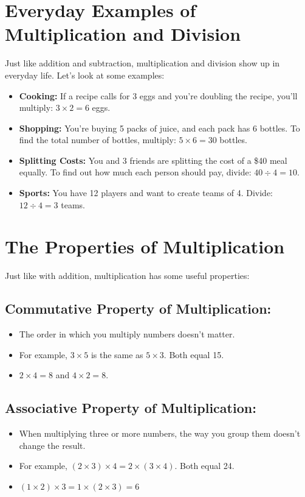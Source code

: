 \section{Everyday Examples of Multiplication and Division}
Just like addition and subtraction, multiplication and division show up in everyday life. Let’s look at some examples:
\begin{itemize}
    \item \textbf{Cooking:} If a recipe calls for 3 eggs and you’re doubling the recipe, you’ll multiply: $3 \times 2 = 6$ eggs.
    \item \textbf{Shopping:} You’re buying 5 packs of juice, and each pack has 6 bottles. To find the total number of bottles, multiply: $5 \times 6 = 30$ bottles.
    \item \textbf{Splitting Costs:} You and 3 friends are splitting the cost of a \$40 meal equally. To find out how much each person should pay, divide: $40 \div 4 = 10$.
    \item \textbf{Sports:} You have 12 players and want to create teams of 4. Divide: $12 \div 4 = 3$ teams.
\end{itemize}

\section{The Properties of Multiplication}
Just like with addition, multiplication has some useful properties:

\subsection{Commutative Property of Multiplication:}
\begin{itemize}
    \item The order in which you multiply numbers doesn’t matter.
    \item For example, $3 \times 5$ is the same as $5 \times 3$. Both equal 15.
    \item $2 \times 4 = 8$ and $4 \times 2 = 8$.
\end{itemize}

\subsection{Associative Property of Multiplication:}
\begin{itemize}
    \item When multiplying three or more numbers, the way you group them doesn’t change the result.
    \item For example, $(2 \times 3) \times 4 = 2 \times (3 \times 4)$. Both equal 24.
    \item $(1 \times 2) \times 3 = 1 \times (2 \times 3) = 6$
\end{itemize}

